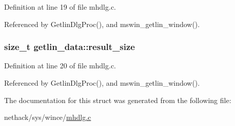 Definition at line 19 of file mhdlg.\+c.



Referenced by Getlin\+Dlg\+Proc(), and mswin\+\_\+getlin\+\_\+window().

\hypertarget{structgetlin__data_a94955d5ee37e0a74dce5438809152c34}{
\subsubsection[{result\+\_\+size}]{\setlength{\rightskip}{0pt plus 5cm}size\+\_\+t getlin\+\_\+data\+::result\+\_\+size}}\label{structgetlin__data_a94955d5ee37e0a74dce5438809152c34}


Definition at line 20 of file mhdlg.\+c.



Referenced by Getlin\+Dlg\+Proc(), and mswin\+\_\+getlin\+\_\+window().



The documentation for this struct was generated from the following file\+:\begin{DoxyCompactItemize}
\item 
nethack/sys/wince/\hyperlink{sys_2wince_2mhdlg_8c}{mhdlg.\+c}\end{DoxyCompactItemize}
